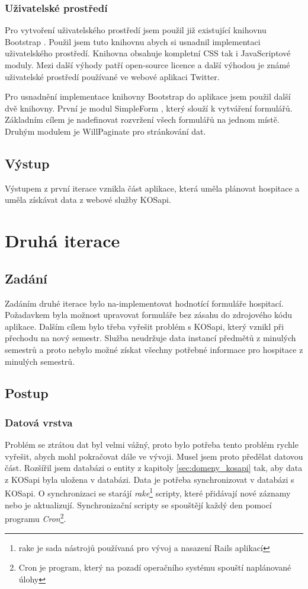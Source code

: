 \subsubsection{Uživatelské prostředí}
Pro vytvoření uživatelského prostředí jsem použil již existující knihovnu Bootstrap \cite{bootstrap}. Použil jsem tuto knihovnu abych si usnadnil implementaci uživatelského prostředí. Knihovna obsahuje kompletní CSS tak i JavaScriptové moduly. Mezi další výhody patří open-source licence a další výhodou je známé uživatelské prostředí používané ve webové aplikaci Twitter.

Pro usnadnění implementace knihovny Bootstrap do aplikace jsem použil další dvě knihovny. První je modul SimpleForm \cite{simpleform}, který slouží k vytváření formulářů. Základním cílem je nadefinovat rozvržení všech formulářů na jednom místě. Druhým modulem je WillPaginate \cite{willpaginate} pro stránkování dat.

\subsection{Výstup} 
Výstupem z první iterace vznikla část aplikace, která uměla plánovat hospitace a uměla získávat data z webové služby KOSapi.


\section{Druhá iterace}
\subsection{Zadání}
Zadáním druhé iterace bylo na-implementovat hodnotící formuláře hospitací. Požadavkem byla možnost upravovat formuláře bez zásahu do zdrojového kódu aplikace. Dalším cílem bylo třeba vyřešit problém s KOSapi, který vznikl při přechodu na nový semestr. Služba neudržuje data instancí předmětů z minulých semestrů a proto nebylo možné získat všechny potřebné informace pro hospitace z minulých semestrů.

\subsection{Postup}
\subsubsection{Datová vrstva}
Problém se ztrátou dat byl velmi vážný, proto bylo potřeba tento problém rychle vyřešit, abych mohl pokračovat dále ve vývoji. Musel jsem proto předělat datovou část. Rozšířil jsem databázi o entity z kapitoly \ref{sec:domeny_kosapi} tak, aby data z KOSapi byla uložena v databázi. Data je potřeba synchronizovat v databázi s KOSapi. O synchronizaci se starájí \textit{rake}\footnote{rake je sada nástrojů používaná pro vývoj a nasazení Rails aplikací} scripty, které přidávají nové záznamy nebo je aktualizují. Synchronizační scripty se spouštějí každý den pomocí programu \textit{Cron}\footnote{Cron je program, který na pozadí operačního systému spouští naplánované úlohy}.

